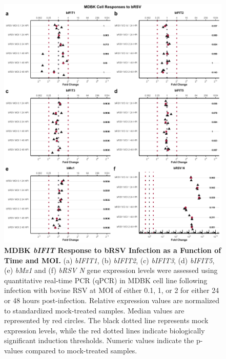 \begin{figure}
    \centering
    \includegraphics[width=1\linewidth]{07. Chapter 2/Figs/02. Induction/03. mdbk_brsv_timepoints.pdf}
    \caption[MDBK \textit{bIFIT} Response to bRSV Infection as a Function of Time and MOI.]{\textbf{MDBK \textit{bIFIT} Response to bRSV Infection as a Function of Time and MOI.} (a) \textit{bIFIT1}, (b) \textit{bIFIT2}, (c) \textit{bIFIT3}, (d) \textit{bIFIT5}, (e) \textit{bMx1} and (f) \textit{bRSV N} gene expression levels were assessed using quantitative real-time PCR (qPCR) in MDBK cell line following infection with bovine RSV at MOI of either 0.1, 1, or 2 for either 24 or 48 hours post-infection. Relative expression values are normalized to standardized mock-treated samples. Median values are represented by red circles. The black dotted line represents mock expression levels, while the red dotted lines indicate biologically significant induction thresholds. Numeric values indicate the p-values compared to mock-treated samples.}
    \label{fig:MDBK responses to bRSV timepoints}
\end{figure}

